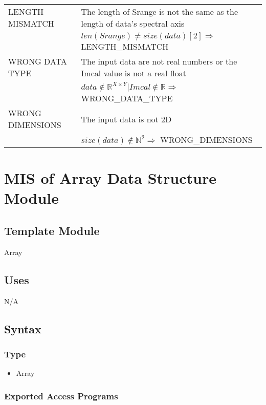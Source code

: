 \documentclass[12pt, titlepage]{article}
\begin{document}
\begin{itemize}
\begin{center}
\begin{tabular}{p{3cm} p{12cm}}
        \midrule[0.05em]
        LENGTH MISMATCH & The length of Srange is not the same as the length of data's spectral axis\\
        & $len(Srange) \neq size(data)[2] \Rightarrow$ LENGTH\_MISMATCH\\
        \midrule[0.05em]
        WRONG DATA TYPE & The input data are not real numbers or the Imcal value is not a real float\\
        & $data \notin \mathbb{R}^{X \times Y}  | Imcal \notin \mathbb{R} \Rightarrow$ WRONG\_DATA\_TYPE \\ 
        \midrule[0.05em]
        WRONG DIMENSIONS & The input data is not 2D\\
        & $size(data) \notin \mathbb{N}^2 \Rightarrow $ WRONG\_DIMENSIONS\\
        \bottomrule[0.15em]
    \end{tabular}
\end{center}
\end{itemize}

\section{MIS of Array Data Structure Module} \label{Mod:Array}

\subsection{Template Module}

Array

\subsection{Uses}
N/A

\subsection{Syntax}

\subsubsection{Type}
\begin{itemize}
    \item Array
\end{itemize}

\subsubsection{Exported Access Programs}
\end{document}
